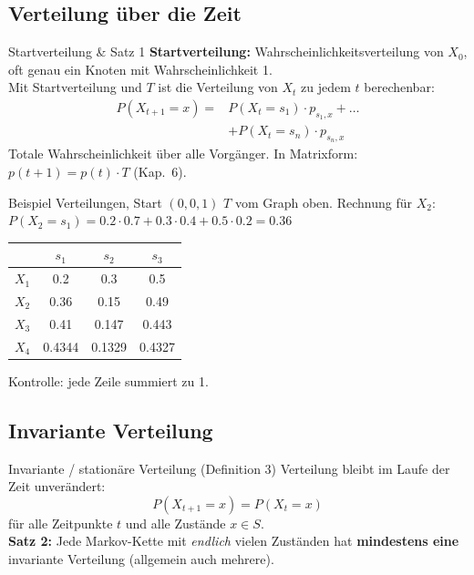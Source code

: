 \documentclass[a4paper, fontsize=7pt]{scrartcl}
\renewcommand*{\arraystretch}{1.5}  %
\begin{document}
\subsection{Verteilung über die Zeit}

\begin{mainbox}{Startverteilung \& Satz 1}
\textbf{Startverteilung:} Wahrscheinlichkeitsverteilung von $X_0$, oft genau ein
Knoten mit Wahrscheinlichkeit 1.\\
Mit Startverteilung und $T$ ist die Verteilung von $X_t$ zu jedem $t$ berechenbar:
\begin{align*}
P(X_{t+1} = x) ={}& P(X_t = s_1) \cdot p_{s_1, x} + \ldots\\
&+ P(X_t = s_n) \cdot p_{s_n, x}
\end{align*}
Totale Wahrscheinlichkeit über alle Vorgänger. In Matrixform: $p(t+1) = p(t) \cdot T$
(Kap.\ 6).
\end{mainbox}

\begin{subbox}{Beispiel Verteilungen, Start $(0, 0, 1)$}
$T$ vom Graph oben. Rechnung für $X_2$:\\
$P(X_2 = s_1) = 0.2 \cdot 0.7 + 0.3 \cdot 0.4 + 0.5 \cdot 0.2 = 0.36$
\renewcommand*{\arraystretch}{1.1}
\begin{center}
\begin{tabular}{l|ccc}
 & $s_1$ & $s_2$ & $s_3$ \\ \hline
$X_1$ & 0.2 & 0.3 & 0.5 \\
$X_2$ & 0.36 & 0.15 & 0.49 \\
$X_3$ & 0.41 & 0.147 & 0.443 \\
$X_4$ & 0.4344 & 0.1329 & 0.4327
\end{tabular}
\end{center}
Kontrolle: jede Zeile summiert zu 1.
\end{subbox}

\subsection{Invariante Verteilung}

\begin{mainbox}{Invariante / stationäre Verteilung (Definition 3)}
Verteilung bleibt im Laufe der Zeit unverändert:
$$\boxed{P(X_{t+1} = x) = P(X_t = x)}$$
für alle Zeitpunkte $t$ und alle Zustände $x \in S$.\\
\textbf{Satz 2:} Jede Markov-Kette mit \emph{endlich} vielen Zuständen hat
\textbf{mindestens eine} invariante Verteilung (allgemein auch mehrere).
\end{mainbox}
\end{document}
